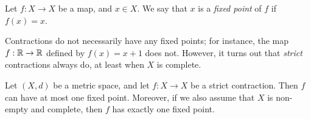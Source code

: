 \begin{defn}\label{ii:6.6.3}
  Let \(f : X \to X\) be a map, and \(x \in X\).
  We say that \(x\) is a \emph{fixed point} of \(f\) if \(f(x) = x\).
\end{defn}

\begin{note}
  Contractions do not necessarily have any fixed points;
  for instance, the map \(f : \mathbb{R} \to \mathbb{R}\) defined by \(f(x) = x + 1\) does not.
  However, it turns out that \emph{strict} contractions always do, at least when \(X\) is complete.
\end{note}

\begin{thm}\label{ii:6.6.4}
  Let \((X, d)\) be a metric space, and let \(f : X \to X\) be a strict contraction.
  Then \(f\) can have at most one fixed point.
  Moreover, if we also assume that \(X\) is non-empty and complete, then \(f\) has exactly one fixed point.
\end{thm}

